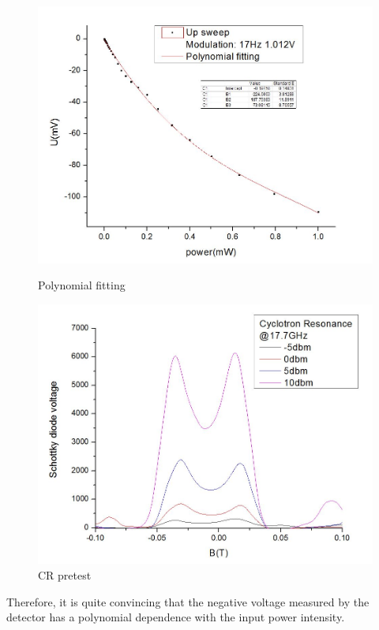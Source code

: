 \documentclass[12pt]{ruthesis}
\begin{document}
\begin{figure}[!htb]\centering
   \begin{minipage}{0.49\textwidth}
     \includegraphics[width=\linewidth]{figures/cali_fitting.JPG}
     \caption{Polynomial fitting}\label{cali_fitting}
   \end{minipage}
   \begin {minipage}{0.49\textwidth}
     \includegraphics[width=\linewidth]{figures/CRpowerdep.JPG}
     \caption{CR pretest}\label{crpowerdep}
   \end{minipage}
\end{figure}


Therefore, it is quite convincing that the negative voltage measured by the detector has a polynomial dependence with the input power intensity.
 
\end{document}
